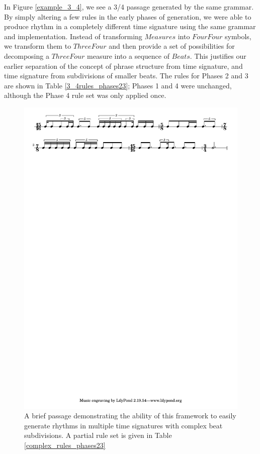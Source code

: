 \documentclass{article}
\begin{document}
In Figure \ref{example_3_4}, we see a 3/4 passage generated by the same grammar. By simply altering a few rules in the early phases of generation, we were able to produce rhythm in a completely different time signature using the same grammar and implementation. Instead of transforming $Measures$ into $FourFour$ symbols, we transform them to \linebreak $ThreeFour$ and then provide a set of possibilities for decomposing a $ThreeFour$ measure into a sequence of \linebreak $Beats$. This justifies our earlier separation of the concept of phrase structure from time signature, and time signature from subdivisions of smaller beats. The rules for Phases 2 and 3 are shown in Table \ref{3_4rules_phases23}; Phases 1 and 4 were unchanged, although the Phase 4 rule set was only applied once.


\begin{figure}[t] %
\centering
\includegraphics[width=16cm]{complex.pdf}
\caption{A brief passage demonstrating the ability of this framework to easily generate rhythms in multiple time signatures with complex beat subdivisions. A partial rule set is given in Table \ref{complex_rules_phases23}}\label{example_complex}
\end{figure}
\end{document}
